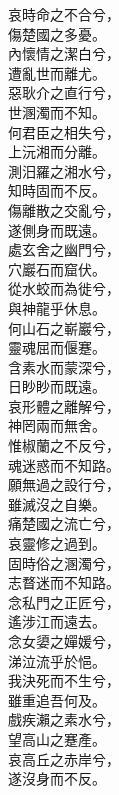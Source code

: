 
\begin{pinyinscope}

\begin{shici}

哀時命之不合兮，\\
傷楚國之多憂。\\
內懷情之潔白兮，\\
遭亂世而離尤。\\
惡耿介之直行兮，\\
世溷濁而不知。\\
何君臣之相失兮，\\
上沅湘而分離。\\
測汨羅之湘水兮，\\
知時固而不反。\\
傷離散之交亂兮，\\
遂側身而既遠。\\
處玄舍之幽門兮，\\
穴巖石而窟伏。\\
從水蛟而為徙兮，\\
與神龍乎休息。\\
何山石之嶄巖兮，\\
靈魂屈而偃蹇。\\
含素水而蒙深兮，\\
日眇眇而既遠。\\
哀形體之離解兮，\\
神罔兩而無舍。\\
惟椒蘭之不反兮，\\
魂迷惑而不知路。\\
願無過之設行兮，\\
雖滅沒之自樂。\\
痛楚國之流亡兮，\\
哀靈修之過到。\\
固時俗之溷濁兮，\\
志瞀迷而不知路。\\
念私門之正匠兮，\\
遙涉江而遠去。\\
念女嬃之嬋媛兮，\\
涕泣流乎於悒。\\
我決死而不生兮，\\
雖重追吾何及。\\
戲疾瀨之素水兮，\\
望高山之蹇產。\\
哀高丘之赤岸兮，\\
遂沒身而不反。\\

\end{shici}

\end{pinyinscope}
